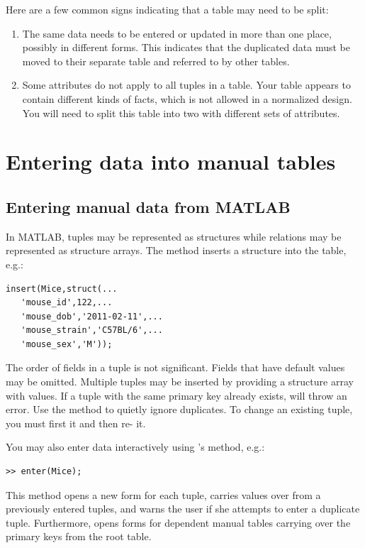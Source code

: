 \documentclass[10pt]{article}
\begin{document}
Here are a few common signs indicating that a table may need to be split:
\begin{enumerate}
\item The same data needs to be entered or updated in more than one place, possibly in different forms.  This indicates that the duplicated data must be moved to their separate table and referred to by other tables. 
\item Some attributes do not apply to all tuples in a table.  Your table appears to contain different kinds of facts, which is not allowed in a normalized design. You will need to split this table into two with different sets of attributes. 
\end{enumerate}




\newpage\section{Entering data into manual tables}\label{sec:entry}
\subsection{Entering manual data from MATLAB}
In MATLAB, tuples may be represented as structures while relations may be represented as structure arrays.  The  method  inserts a structure into the table, e.g.:
\begin{lstlisting}
insert(Mice,struct(...
   'mouse_id',122,...
   'mouse_dob','2011-02-11',...
   'mouse_strain','C57BL/6',...
   'mouse_sex','M'));
\end{lstlisting}

The order of fields in a tuple is not significant. Fields that have default values may be omitted.  Multiple tuples may be inserted by providing a structure array with values. If a tuple with the same primary key already exists,  will throw an error.  Use the  method to quietly ignore duplicates.  To change an existing tuple, you must first  it and then re- it.

You may also enter data interactively using 's  method, e.g.:
\begin{lstlisting}
>> enter(Mice);
\end{lstlisting}  
This method opens a new form for each tuple, carries values over from a previously entered tuples, and warns the user if she attempts to enter a duplicate tuple. Furthermore,  opens forms for dependent manual tables carrying over the primary keys from the root table.
\end{document}
